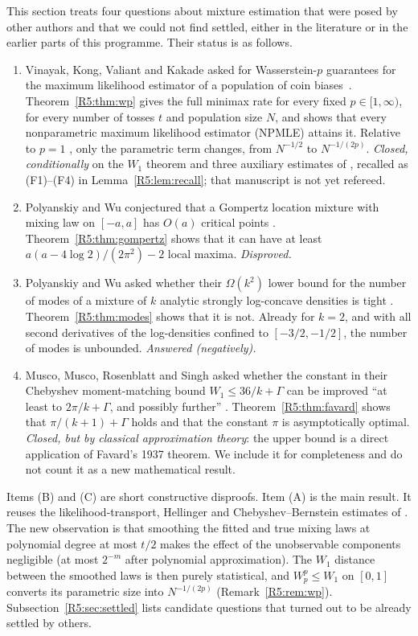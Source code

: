 \documentclass[11pt]{amsart}
\theoremstyle{definition}
\theoremstyle{remark}
\begin{document}
This section treats four questions about mixture estimation that were posed
by other authors and that we could not find settled, either in the
literature or in the earlier parts of this programme.  Their status is as
follows.

\begin{enumerate}
\item[(A)] Vinayak, Kong, Valiant and Kakade asked for Wasserstein-$p$
 guarantees for the maximum likelihood estimator of a population of coin
 biases~\cite[Sec.~5]{R5-VKVK19}.  Theorem~\ref{R5:thm:wp} gives the full
 minimax rate for every fixed $p\in[1,\infty)$, for every number of tosses
 $t$ and population size $N$, and shows that every nonparametric maximum
 likelihood estimator (NPMLE) attains it.  Relative to $p=1$
 \cite[Part~VI]{K-029}, only the parametric term changes, from $N^{-1/2}$
 to $N^{-1/(2p)}$.  \emph{Closed, conditionally} on the $W_1$ theorem and three
 auxiliary estimates of \cite[Part~VI]{K-029}, recalled as (F1)--(F4) in
 Lemma~\ref{R5:lem:recall}; that manuscript is not yet refereed.
\item[(B)] Polyanskiy and Wu conjectured that a Gompertz location mixture
 with mixing law on $[-a,a]$ has $O(a)$ critical points
 \cite[Sec.~5.2]{R5-PW20}.  Theorem~\ref{R5:thm:gompertz} shows that it can
 have at least $a(a-4\log 2)/(2\pi^2)-2$ local maxima.  \emph{Disproved.}
\item[(C)] Polyanskiy and Wu asked whether their $\Omega(k^2)$ lower bound
 for the number of modes of a mixture of $k$ analytic strongly log-concave
 densities is tight \cite[Sec.~5.5]{R5-PW20}.  Theorem~\ref{R5:thm:modes}
 shows that it is not.  Already for $k=2$, and with all second derivatives
 of the log-densities confined to $[-3/2,-1/2]$, the number of modes is
 unbounded.  \emph{Answered (negatively).}
\item[(D)] Musco, Musco, Rosenblatt and Singh asked whether the constant in
 their Chebyshev moment-matching bound $W_1\le 36/k+\Gamma$ can be improved
 ``at least to $2\pi/k+\Gamma$, and possibly further''
 \cite[Sec.~1.2 and~3.1]{R5-MMRS25}.  Theorem~\ref{R5:thm:favard} shows that
 $\pi/(k+1)+\Gamma$ holds and that the constant $\pi$ is asymptotically
 optimal.  \emph{Closed, but by classical approximation theory}: the upper
 bound is a direct application of Favard's 1937 theorem.  We include it for
 completeness and do not count it as a new mathematical result.
\end{enumerate}

Items (B) and (C) are short constructive disproofs.  Item (A) is the main
result.  It reuses the likelihood-transport, Hellinger and
Chebyshev--Bernstein estimates of \cite[Part~VI]{K-029}.  The new
observation is that smoothing the fitted and true mixing laws at polynomial
degree at most $t/2$ makes the effect of the unobservable components
negligible (at most $2^{-m}$ after polynomial approximation).  The $W_1$
distance between the smoothed laws is then purely statistical, and
$W_p^p\le W_1$ on $[0,1]$ converts its parametric size into $N^{-1/(2p)}$
(Remark~\ref{R5:rem:wp}).  Subsection~\ref{R5:sec:settled} lists candidate
questions that turned out to be already settled by others.
\end{document}
